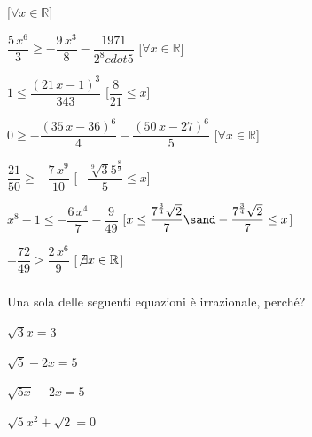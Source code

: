 \begin{esercizio}
\begin{enumeratea}
\hfill [\(\forall x \in \mathbb{R}\)]
\item \({\dfrac{5\,{x}^{6}}{3}}\geq -{\dfrac{9\,{x}^{3}}{8}}-{\dfrac
{1971}{2^8  cdot 5}}\) 
\hfill [\(\forall x \in \mathbb{R}\)]
\item \(1\leq {\dfrac{ \left( 21\,x-1 \right) ^{3}}{343}}\) 
\hfill [\({\dfrac{8}{21}}\leq x\)]
\item \(0\geq -{\dfrac{ \left( 35\,x-36 \right) ^{6}}{4}}-{\dfrac{ 
\left( 50\,x-27 \right) ^{6}}{5}}\) 
\hfill [\(\forall x \in \mathbb{R}\)]
\item \({\dfrac{21}{50}}\geq -{\dfrac{7\,{x}^{9}}{10}}\) 
\hfill [\(-{\dfrac{\sqrt [9]{3}{5}^{{\frac{8}{9}}}}{5}}\leq x\)]
\item \({x}^{8}-1\leq -{\dfrac{6\,{x}^{4}}{7}}-{\dfrac{9}{49}}\) 
\hfill [\(x\leq {\dfrac{{7}^{{\frac{3}{4}}}\sqrt {2}}{7}} \sand -{\dfrac
{{7}^{{\frac{3}{4}}}\sqrt {2}}{7}}\leq x\)]
\item \(-{\dfrac{72}{49}}\geq {\dfrac{2\,{x}^{6}}{9}}\) 
\hfill [\(\not\exists x \in \mathbb{R}\)]
\end{enumeratea}
\end{esercizio}


\subsubsection*{}


\begin{esercizio}\label{ese:03.1}
Una sola delle seguenti equazioni è irrazionale, perché?
\begin{multicols}{4}
\begin{enumeratea}
\item \(\sqrt{3} x = 3\)
\item \(\sqrt{5} -2x = 5\)
\item \(\sqrt{5x} -2x = 5\)
\item \(\sqrt{5}x^2 +\sqrt{2} = 0\)
\end{enumeratea}
\end{multicols}
\end{esercizio}

